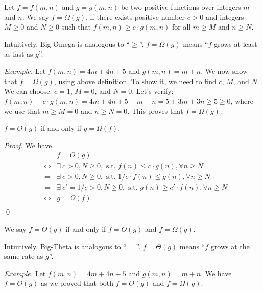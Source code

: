 \begin{definition}[Big-O]
Let $f = f(m,n)$ and $g=g(m,n)$ be two positive functions over integers $m$ and $n$.
We say $f = \Omega(g)$, if there exists positive number $c > 0$ and integers $M\ge 0$ and $N \ge 0$
such that $f(m,n) \ge c\cdot g(m,n)$ for all $m\ge M$ and $n\ge N$.
\end{definition}

Intuitively, Big-Omega is analogous to ``$\ge$''.
$f=\Omega(g)$ means ``$f$ grows at least as fast as $g$''.

\emph{Example.} Let $f(m,n) = 4m + 4n + 5$ and $g(m,n) = m + n$. We now show that $f = \Omega(g)$,
using above definition. To show it, we need to find $c$, $M$, and $N$. 
We can choose: $c = 1$, $M = 0$, and $N = 0$.
Let's verify: $f(m,n) - c\cdot g(m,n) = 4m + 4n + 5 - m - n = 5 + 3m + 3n \ge 5 \ge 0$,
where we use that $m \ge M = 0$ and $n \ge N = 0$. This proves that $f = \Omega(g)$.

\begin{claim}
$f = O(g)$ if and only if $g = \Omega(f)$.
\end{claim}

\emph{Proof.} We have\\
		\begin{displaymath}
		\begin{array}{llll}
		& & f = O(g) \\
		& \Leftrightarrow & \exists\ c > 0, N \ge 0, \textrm{ s.t.\ } f(n) \le c\cdot g(n), \forall n \ge N\\
		& \Leftrightarrow & \exists\ c > 0, N \ge 0, \textrm{ s.t.\ } 1/c \cdot f(n) \le g(n), \forall n \ge N\\
		& \Leftrightarrow & \exists\ c' = 1/c > 0, N \ge 0, \textrm{ s.t.\ } g(n) \ge c'\cdot f(n), \forall n \ge N\\
		& \Leftrightarrow & g = \Omega(f) \\
		\end{array}
		\end{displaymath}
\qed

\begin{definition}
We say $f = \Theta(g)$ if and only if $f = O(g)$ and $f = \Omega(g)$.
\end{definition}

Intuitively, Big-Theta is analogous to ``$=$''.
$f=\Theta(g)$ means ``$f$ grows at the same rate as $g$''.

\emph{Example.} Let $f(m,n) = 4m + 4n + 5$ and $g(m,n) = m + n$. We have $f = \Theta(g)$ as 
we proved that both $f = O(g)$ and $f = \Omega(g)$.

